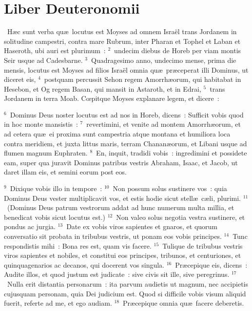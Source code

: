 {\centering \section*{Liber Deuteronomii}}\thispagestyle{empty}

~\lettrine[lines=10,image=true,loversize=0.05,lraise=-0.03]{H}{}\ae c sunt verba qu\ae\ locutus est Moyses ad omnem Isra\"el trans Jordanem in solitudine campestri, contra mare Rubrum, inter Pharan et Tophel et Laban et Haseroth, ubi auri est plurimum~:
${}^{2}$~undecim diebus de Horeb per viam montis Seir usque ad Cadesbarne.
${}^{3}$~Quadragesimo anno, undecimo mense, prima die mensis, locutus est Moyses ad filios Isra\"el omnia qu\ae\ pr\ae ceperat illi Dominus, ut diceret eis,
${}^{4}$~postquam percussit Sehon regem Amorrh\ae orum, qui habitabat in Hesebon, et Og regem Basan, qui mansit in Astaroth, et in Edrai,
${}^{5}$~trans Jordanem in terra Moab. Cœpitque Moyses explanare legem, et dicere~:


${}^{6}$~Dominus Deus noster locutus est ad nos in Horeb, dicens~: Sufficit vobis quod in hoc monte mansistis~:
${}^{7}$~revertimini, et venite ad montem Amorrh\ae orum, et ad cetera qu\ae\ ei proxima sunt campestria atque montana et humiliora loca contra meridiem, et juxta littus maris, terram Chanan\ae orum, et Libani usque ad flumen magnum Euphraten.
${}^{8}$~En, inquit, tradidi vobis~: ingredimini et possidete eam, super qua juravit Dominus patribus vestris Abraham, Isaac, et Jacob, ut daret illam eis, et semini eorum post eos.


${}^{9}$~Dixique vobis illo in tempore~:
${}^{10}$~Non possum solus sustinere vos~: quia Dominus Deus vester multiplicavit vos, et estis hodie sicut stell\ae\ c\ae li, plurimi.
${}^{11}$~(Dominus Deus patrum vestrorum addat ad hunc numerum multa millia, et benedicat vobis sicut locutus est.)
${}^{12}$~Non valeo solus negotia vestra sustinere, et pondus ac jurgia.
${}^{13}$~Date ex vobis viros sapientes et gnaros, et quorum conversatio sit probata in tribubus vestris, ut ponam eos vobis principes.
${}^{14}$~Tunc respondistis mihi~: Bona res est, quam vis facere.
${}^{15}$~Tulique de tribubus vestris viros sapientes et nobiles, et constitui eos principes, tribunos, et centuriones, et quinquagenarios ac decanos, qui docerent vos singula.
${}^{16}$~Pr\ae cepique eis, dicens~: Audite illos, et quod justum est judicate~: sive civis sit ille, sive peregrinus.
${}^{17}$~Nulla erit distantia personarum~: ita parvum audietis ut magnum, nec accipietis cujusquam personam, quia Dei judicium est. Quod si difficile vobis visum aliquid fuerit, referte ad me, et ego audiam.
${}^{18}$~Pr\ae cepique omnia qu\ae\ facere deberetis.


